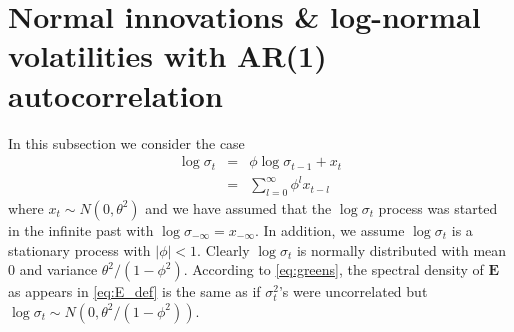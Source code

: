 \documentclass{article}
\begin{document}
\section{Normal innovations \& log-normal volatilities with AR(1)
  autocorrelation}
In this subsection we consider the case
\begin{eqnarray}
  \log \sigma_t &=& \phi\log \sigma_{t-1} + x_t \nonumber \\
  &=& \sum_{l = 0}^{\infty} \phi^l x_{t-l} \label{eq:AR}
\end{eqnarray}
where $x_t \sim N(0, \theta^2)$ and we have assumed that the $\log
\sigma_t$ process was started in the infinite past with $\log
\sigma_{-\infty} = x_{-\infty}$. In addition, we assume $\log
\sigma_t$ is a stationary process with $|\phi| < 1$. Clearly $\log
\sigma_t$ is normally distributed with mean 0 and variance ${\theta^2
  / (1 - \phi^2)}$. According to \eqref{eq:greens}, the spectral
density of $\bm E$ as appears in \eqref{eq:E_def} is the same as if
$\sigma_t^2$'s were uncorrelated but $\log \sigma_t \sim N(0,
\theta^2/(1 - \phi^2))$.
\end{document}
